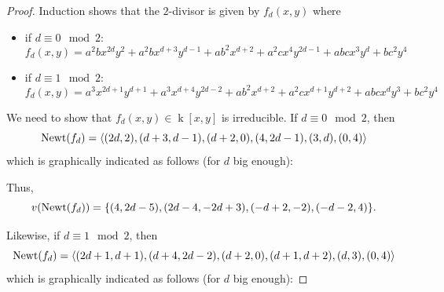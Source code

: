 \documentclass[reqno,oneside,11pt]{amsart}
\theoremstyle{definition}
\DeclareMathOperator{\field}{k}
\begin{document}
\begin{proof} Induction shows that the $2$-divisor is given by $f_{d}(x,y)$ where
\begin{itemize}
    \item if $d\equiv 0 \mod 2$:
        $$
            f_{d}(x,y) = a^{2}bx^{2d}y^{2}+a^{2}bx^{d+3}y^{d-1}+ab^{2}x^{d+2}+a^{2}cx^{4}y^{2d-1}+abcx^{3}y^{d}+bc^{2}y^{4}
        $$
    \item if $d\equiv 1 \mod 2$:
        $$
            f_{d}(x,y) = a^{3}x^{2d+1}y^{d+1}+a^{3}x^{d+4}y^{2d-2}+ab^{2}x^{d+2}+a^{2}cx^{d+1}y^{d+2}+abcx^{d}y^{3}+bc^{2}y^{4}
        $$
\end{itemize}

We need to show that $f_{d}(x,y) \in \field[x,y]$ is irreducible. If $d \equiv 0 \mod{2}$, then
\[{\rm Newt}(f_d) = \langle (2d, 2), (d+3,d-1), (d+2,0), (4,2d-1), (3,d), (0,4)\rangle\]
which is graphically indicated as follows (for $d$ big enough):


Thus,
\[v({\rm Newt}(f_d)) = \{(4,2d-5), (2d-4,-2d+3), (-d+2,-2), (-d-2,4)\}.\]

Likewise, if $d \equiv 1 \mod{2}$, then 
\[{\rm Newt}(f_d) = \langle (2d+1,d+1), (d+4,2d-2), (d+2,0), (d+1,d+2), (d,3), (0,4)\rangle\]
which is graphically indicated as follows (for $d$ big enough):

\end{proof}
\end{document}
